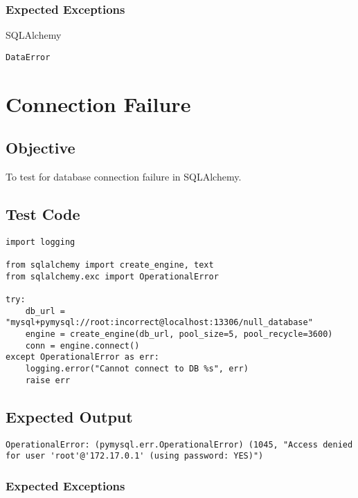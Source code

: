 \documentclass[12pt]{article}
\begin{document}
\subsubsection{Expected Exceptions}

SQLAlchemy 

\begin{verbatim}
DataError
\end{verbatim}

\section{Connection Failure}

\subsection{Objective}

To test for database connection failure in SQLAlchemy.

\subsection{Test Code}

\begin{verbatim}
import logging

from sqlalchemy import create_engine, text
from sqlalchemy.exc import OperationalError

try:
    db_url = "mysql+pymysql://root:incorrect@localhost:13306/null_database"
    engine = create_engine(db_url, pool_size=5, pool_recycle=3600)
    conn = engine.connect()
except OperationalError as err:
    logging.error("Cannot connect to DB %s", err)
    raise err

\end{verbatim}

\subsection{Expected Output}

\begin{lstlisting}
OperationalError: (pymysql.err.OperationalError) (1045, "Access denied for user 'root'@'172.17.0.1' (using password: YES)")
\end{lstlisting}

\subsubsection{Expected Exceptions}
\end{document}
